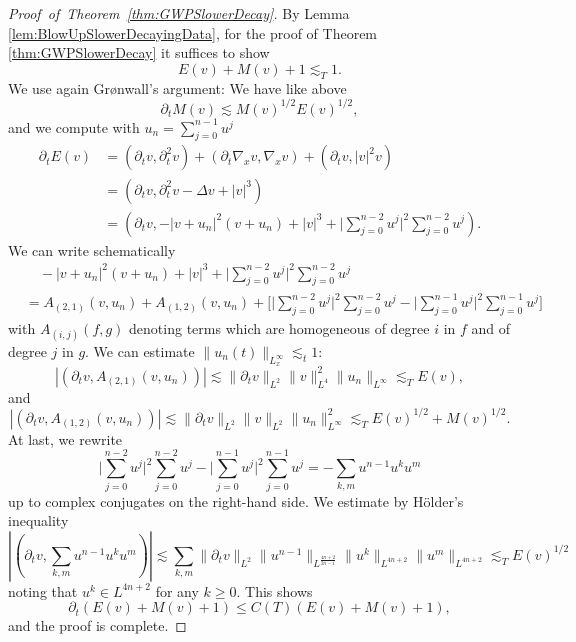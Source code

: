 \documentclass[10pt,a4paper]{amsart}
\begin{document}
\begin{proof}[Proof~of~Theorem~\ref{thm:GWPSlowerDecay}]
By Lemma \ref{lem:BlowUpSlowerDecayingData}, for the proof of Theorem \ref{thm:GWPSlowerDecay} it suffices to show
\begin{equation*}
E(v) + M(v) + 1 \lesssim_T 1.
\end{equation*}
We use again Gr\o nwall's argument: We have like above
\begin{equation*}
\partial_t M(v) \lesssim M(v)^{1/2} E(v)^{1/2},
\end{equation*}
and we compute with $u_n = \sum_{j=0}^{n-1} u^j$
\begin{equation*}
\begin{split}
\partial_t E(v) &= (\partial_t v, \partial_t^2 v) + (\partial_t \nabla_x v, \nabla_x v) + (\partial_t v, |v|^2 v) \\
&= (\partial_t v, \partial_t^2 v - \Delta v + |v|^3) \\
&= (\partial_t v, -|v+u_n|^2 (v+u_n) + |v|^3 + \big| \sum_{j=0}^{n-2} u^j \big|^2 \sum_{j=0}^{n-2} u^j).
\end{split}
\end{equation*}
We can write schematically
\begin{equation*}
\begin{split}
&\quad -|v+u_n|^2 (v+u_n) + |v|^3 + \big| \sum_{j=0}^{n-2} u^j \big|^2 \sum_{j=0}^{n-2} u^j \\
&= A_{(2,1)}(v,u_n) + A_{(1,2)}(v,u_n) + \big[ \big| \sum_{j=0}^{n-2} u^j \big|^2 \sum_{j=0}^{n-2} u^j - \big| \sum_{j=0}^{n-1} u^j \big|^2 \sum_{j=0}^{n-1} u^j \big]
\end{split}
\end{equation*}
with $A_{(i,j)}(f,g)$ denoting terms which are homogeneous of degree $i$ in $f$ and of degree $j$ in $g$. We can estimate
$\| u_n(t) \|_{L_x^\infty} \lesssim_t 1$:
\begin{equation*}
|(\partial_t v, A_{(2,1)}(v,u_n) )| \lesssim \| \partial_t  v\|_{L^2} \|v \|^2_{L^4} \| u_n \|_{L^\infty} \lesssim_T E(v),
\end{equation*}
and
\begin{equation*}
|(\partial_t v, A_{(1,2)}(v,u_n))| \lesssim \| \partial_t v \|_{L^2} \| v \|_{L^2} \| u_n \|^2_{L^\infty} \lesssim_T E(v)^{1/2} + M(v)^{1/2}.
\end{equation*}
At last, we rewrite
\begin{equation*}
\big| \sum_{j=0}^{n-2} u^j \big|^2 \sum_{j=0}^{n-2} u^j - \big| \sum_{j=0}^{n-1} u^j \big|^2 \sum_{j=0}^{n-1} u^j = - \sum_{k,m} u^{n-1} u^k u^m
\end{equation*}
up to complex conjugates on the right-hand side. We estimate by H\"older's inequality
\begin{equation*}
|(\partial_t v, \sum_{k,m} u^{n-1} u^k u^m)| \lesssim \sum_{k,m} \| \partial_t v \|_{L^2} \| u^{n-1} \|_{L^{\frac{4n+2}{2n-1}}} \| u^k \|_{L^{4n+2}} \| u^m \|_{L^{4n+2}} \lesssim_T E(v)^{1/2}
\end{equation*}
noting that $u^k \in L^{4n+2}$ for any $k \geq 0$. This shows
\begin{equation*}
\partial_t (E(v) + M(v) + 1) \leq C(T) (E(v) + M(v) + 1),
\end{equation*}
and the proof is complete.
\end{proof}
\end{document}
